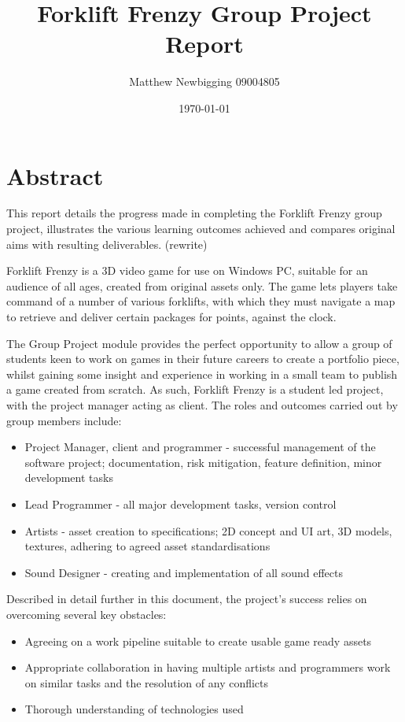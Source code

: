 \documentclass[12pt]{article}
\title{Forklift Frenzy Group Project Report}
\author{Matthew Newbigging 09004805}
\date{\today}
\begin{document}
\maketitle
\newpage

\section{Abstract}
	This report details the progress made in completing the Forklift Frenzy group project, illustrates the various learning outcomes achieved and compares original aims with resulting deliverables. (rewrite)
		
	Forklift Frenzy is a 3D video game for use on Windows PC, suitable for an audience of all ages, created from original assets only. The game lets players take command of a number of various forklifts, with which they must navigate a map to retrieve and deliver certain packages for points, against the clock.
	
	The Group Project module provides the perfect opportunity to allow a group of students keen to work on games in their future careers to create a portfolio piece, whilst gaining some insight and experience in working in a small team to publish a game created from scratch. As such, Forklift Frenzy is a student led project, with the project manager acting as client. The roles and outcomes carried out by group members include:
	\begin{itemize}
		\item Project Manager, client and programmer - successful management of the software project; documentation, risk mitigation, feature definition, minor development tasks
		\item Lead Programmer - all major development tasks, version control
		\item Artists - asset creation to specifications; 2D concept and UI
		art, 3D models, textures, adhering to agreed asset standardisations
		\item Sound Designer - creating and implementation of all sound effects
	\end{itemize}
	
	Described in detail further in this document, the project’s success relies on overcoming several key obstacles:
	\begin{itemize}
		\item Agreeing on a work pipeline suitable to create usable game ready assets
		\item Appropriate collaboration in having multiple artists and programmers work on similar tasks and the resolution of any conflicts 
		\item Thorough understanding of technologies used
	\end{itemize}
	
\end{document}
